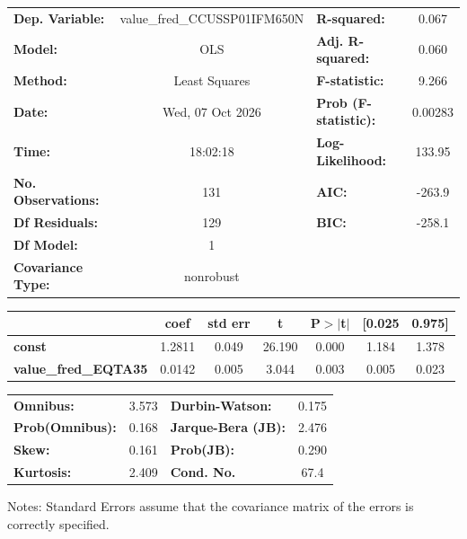 \begin{center}
\begin{tabular}{lclc}
\toprule
\textbf{Dep. Variable:}      & value\_fred\_CCUSSP01IFM650N & \textbf{  R-squared:         } &     0.067   \\
\textbf{Model:}              &             OLS              & \textbf{  Adj. R-squared:    } &     0.060   \\
\textbf{Method:}             &        Least Squares         & \textbf{  F-statistic:       } &     9.266   \\
\textbf{Date:}               &       Wed, 07 Oct 2026       & \textbf{  Prob (F-statistic):} &  0.00283    \\
\textbf{Time:}               &           18:02:18           & \textbf{  Log-Likelihood:    } &    133.95   \\
\textbf{No. Observations:}   &               131            & \textbf{  AIC:               } &    -263.9   \\
\textbf{Df Residuals:}       &               129            & \textbf{  BIC:               } &    -258.1   \\
\textbf{Df Model:}           &                 1            & \textbf{                     } &             \\
\textbf{Covariance Type:}    &          nonrobust           & \textbf{                     } &             \\
\bottomrule
\end{tabular}
\begin{tabular}{lcccccc}
                             & \textbf{coef} & \textbf{std err} & \textbf{t} & \textbf{P$> |$t$|$} & \textbf{[0.025} & \textbf{0.975]}  \\
\midrule
\textbf{const}               &       1.2811  &        0.049     &    26.190  &         0.000        &        1.184    &        1.378     \\
\textbf{value\_fred\_EQTA35} &       0.0142  &        0.005     &     3.044  &         0.003        &        0.005    &        0.023     \\
\bottomrule
\end{tabular}
\begin{tabular}{lclc}
\textbf{Omnibus:}       &  3.573 & \textbf{  Durbin-Watson:     } &    0.175  \\
\textbf{Prob(Omnibus):} &  0.168 & \textbf{  Jarque-Bera (JB):  } &    2.476  \\
\textbf{Skew:}          &  0.161 & \textbf{  Prob(JB):          } &    0.290  \\
\textbf{Kurtosis:}      &  2.409 & \textbf{  Cond. No.          } &     67.4  \\
\bottomrule
\end{tabular}
\end{center}

Notes: \newline
 [1] Standard Errors assume that the covariance matrix of the errors is correctly specified.